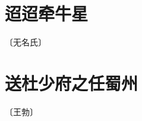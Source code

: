 \documentclass[12pt,UTF-8,openany]{ctexbook}
\begin{document}
\vspace{8pt}


\section{迢迢牵牛星}

\begin{center}
    \vspace{10pt}
    
    \begin{normalsize}
        
        〔无名氏〕
        
    \end{normalsize}
    
    \vspace{8pt}
    
    \begin{large}
        
        
        
        
        
        
    \end{large}
    
\end{center}

\vspace{8pt}


\section{送杜少府之任蜀州}

\begin{center}
    \vspace{10pt}
    
    \begin{normalsize}
        
        〔王勃〕
        
    \end{normalsize}
    
    \vspace{8pt}
    
    \begin{large}
        
        
        
        
        
    \end{large}
    
\end{center}
\end{document}
